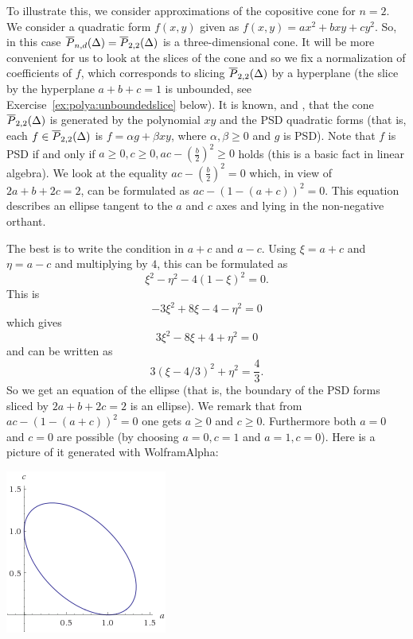 \begin{example}
	To illustrate this, we consider approximations of the copositive cone for $n=2$.  We consider a quadratic form $f(x,y)$ given as $f(x,y) = a x^2 +  b x y + c y^2$. So, in this case $\overline{P}_{n,d}(\Delta)= \overline{P}_{2,2}(\Delta)$ is a three-dimensional cone. It will be more convenient for us to look at the slices of the cone and so we fix a normalization  of coefficients of $f$, which corresponds to slicing $\overline{P}_{2,2}(\Delta)$ by a hyperplane (the slice by the hyperplane $a + b + c=1$ is unbounded, see Exercise~\ref{ex:polya:unboundedslice} below). It is known, and , that the cone $\overline{P}_{2,2}(\Delta)$ is generated by the polynomial $xy$ and the PSD quadratic forms (that is, each $f\in \overline{P}_{2,2}(\Delta)$ is $f = \alpha g + \beta xy$, where $\alpha, \beta \ge 0$ and $g$ is PSD). Note that $f$ is PSD if and only if $a \ge 0, c \ge 0, a c - (\frac{b}{2})^2 \ge 0$ holds (this is a basic fact in linear algebra). We look at the equality $a c - (\frac{b}{2})^2 =0$ which, in view of $2a + b + 2c = 2$, can be formulated as $a c - (1- (a+c))^2 = 0$. This equation describes an ellipse tangent to the $a$ and $c$ axes and lying in the non-negative orthant. 
	
	The best is to write the condition in $a+c$ and $a -c$. Using $\xi=a+c$ and $\eta = a-c$ and multiplying by $4$, this can be formulated as
	\[
		\xi^2 - \eta^2 - 4 (1- \xi)^2 = 0.
	\]
	This is
	\[
		- 3 \xi^2  + 8 \xi - 4 - \eta^2 = 0
	\]
	which gives
	\[
		3 \xi^2 - 8 \xi + 4 + \eta^2 = 0
	\]
	and can be written as
	\[
		3 (\xi - 4/3)^2 + \eta^2 = \frac{4}{3}.
	\]
	So we get an equation of the ellipse (that is, the boundary of the PSD forms sliced by $2a + b + 2c = 2$ is an ellipse). We remark that from $a c - (1 - (a+c))^2 = 0$ one gets $a \ge 0$ and $c \ge 0$. Furthermore both $a =0$ and $c=0$ are possible (by choosing $a=0, c=1$ and $a=1, c = 0$). Here is a picture of it generated with WolframAlpha:
	\begin{center}
		\includegraphics[width=150pt]{sdp_ellipse}
	\end{center}
	

\end{example}
